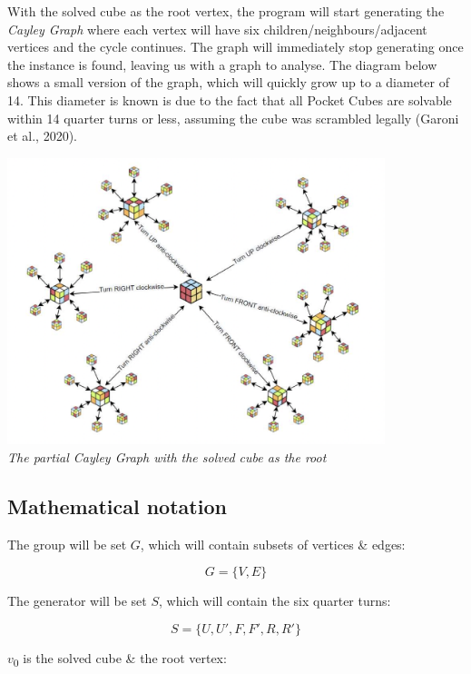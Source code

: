\documentclass[a4paper]{article}
\begin{document}
\par With the solved cube as the root vertex, the program will start generating the \emph{Cayley Graph} where each vertex will have six children/neighbours/adjacent vertices and the cycle continues. The graph will immediately stop generating once the instance is found, leaving us with a graph to analyse. The diagram below shows a small version of the graph, which will quickly grow up to a diameter of 14. This diameter is known is due to the fact that all Pocket Cubes are solvable within 14 quarter turns or less, assuming the cube was scrambled legally (Garoni et al., 2020).

\begin{center}
\includegraphics[width=11cm]{cayley.png}\\
\emph{The partial Cayley Graph with the solved cube as the root}
\end{center}

\subsection{Mathematical notation}

\par The group will be set $G$, which will contain subsets of vertices \& edges:

\[G=\{V,E\}\]

\par The generator will be set $S$, which will contain the six quarter turns:

\[S=\{U,U',F,F',R,R'\}\]

\newpage

\par $v$\textsubscript{0} is the solved cube \& the root vertex:
\end{document}
